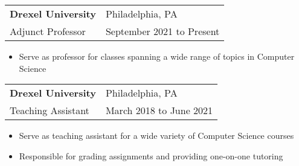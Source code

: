\documentclass[9pt,]{article}
\let\oldparagraph\paragraph
\renewcommand{\paragraph}[1]{\oldparagraph{#1}\mbox{}}
\begin{document}
\begin{tabularx}{\textwidth}{l X}
	\textbf{Drexel University} & \hfill Philadelphia, PA\\
	Adjunct Professor          & \hfill September 2021 to Present
\end{tabularx}

\begin{itemize}
	\setlength\itemsep{-1.75em}
	\item Serve as professor for classes spanning a wide range of topics in Computer Science
\end{itemize}

\begin{tabularx}{\textwidth}{l X}
	\textbf{Drexel University} & \hfill Philadelphia, PA\\
	Teaching Assistant          & \hfill March 2018 to June 2021
\end{tabularx}

\begin{itemize}
	\setlength\itemsep{-1.75em}
	\item Serve as teaching assistant for a wide variety of Computer Science courses\\
	\item Responsible for grading assignments and providing one-on-one tutoring\\
\end{itemize}
\vspace{-2mm}


\vspace{-3mm}


\end{document}
